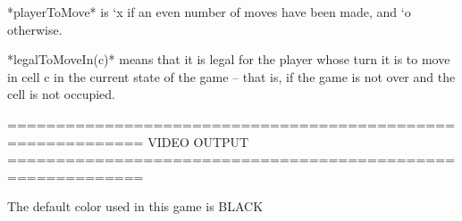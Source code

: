 \documentclass{led_doc}
\begin{document}
\begin{ledDef}
\end{ledDef}

\begin{ledCmnt}
*playerToMove* is `x if an even number of moves have been made, and `o otherwise.
\end{ledCmnt}

\begin{ledDef}
\end{ledDef}

\begin{ledDef}
\end{ledDef}

\begin{ledCmnt}
*legalToMoveIn(c)* means that it is legal for the player whose turn it is to move in cell c in the current state of the game -- that is, if the game is not over and the cell is not occupied.
\end{ledCmnt}

\begin{ledDef}
\end{ledDef}

\begin{ledCmnt}
============================================================
VIDEO OUTPUT
============================================================

The default color used in this game is BLACK
\end{ledCmnt}

\begin{ledDef}
\end{ledDef}

\begin{ledDef}
\end{ledDef}

\begin{ledDef}
\end{ledDef}
\end{document}
